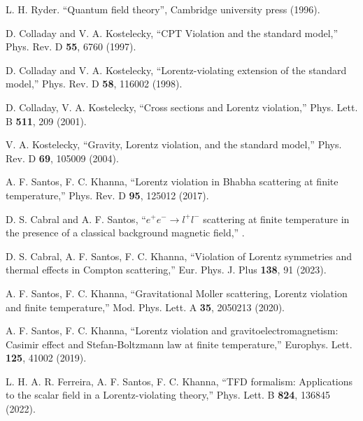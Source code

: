 \documentclass[11pt,showpacs,preprintnumbers,amsmath,amssymb,prd,nofootinbib,superscriptaddress]{revtex4-2}
\begin{document}
\begin{thebibliography}{99}
 L. H. Ryder. ``Quantum field theory'', Cambridge university press (1996).

 D. Colladay and V. A. Kostelecky, ``CPT Violation and the standard model,''  {{Phys. Rev. D} {\bf 55}, 6760 (1997)}.

 D. Colladay and V. A. Kostelecky, ``Lorentz-violating extension of the standard model,''  {{Phys. Rev. D} {\bf 58}, 116002 (1998)}.

 D. Colladay, V. A. Kostelecky, ``Cross sections and Lorentz violation,''  {Phys. Lett. B \textbf{511}, 209 (2001)}.

 V. A. Kostelecky, ``Gravity, Lorentz violation, and the standard model,''  {Phys. Rev. D \textbf{69}, 105009 (2004)}.

 A. F. Santos, F. C. Khanna, ``Lorentz violation in Bhabha scattering at finite temperature,''  {{Phys. Rev. D} {\bf 95}, 125012 (2017)}.

 D. S. Cabral and A. F. Santos, ``$e^{+}e^{-}\to l^{+}l^{-}$  scattering at finite temperature in the presence of a classical background magnetic field,'' .

 D. S. Cabral, A. F. Santos, F. C. Khanna, ``Violation of Lorentz symmetries and thermal effects in Compton scattering,''  {Eur. Phys. J. Plus \textbf{138}, 91 (2023)}.

 A. F. Santos, F. C. Khanna, ``Gravitational Moller scattering, Lorentz violation and finite temperature,''  {Mod. Phys. Lett. A \textbf{35}, 2050213 (2020)}.

 A. F. Santos, F. C. Khanna, ``Lorentz violation and gravitoelectromagnetism: Casimir effect and Stefan-Boltzmann law at finite temperature,''  {Europhys. Lett. \textbf{125}, 41002 (2019)}.

 L. H. A. R. Ferreira, A. F. Santos, F. C. Khanna, ``TFD formalism: Applications to the scalar field in a Lorentz-violating theory,''  {Phys. Lett. B \textbf{824}, 136845 (2022)}.


\end{thebibliography}
\end{document}
